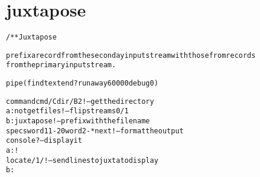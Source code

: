 \section{juxtapose}
\begin{shaded}
\begin{alltt}
/** Juxtapose

prefix a record from the seconday input stream with those from records
from the primary input stream.

pipe (findtext end ? runaway 60000 debug 0 )

   command cmd /C dir /B {2} !              -- get the directory
a: not getfiles !                           -- flip streams 0/1
b: juxtapose !                              -- prefix with the file name
   specs word1 1-20 word2-* next !          -- format the output
   console ?                                -- display it
a: !
   locate /{1}/ !                           -- send lines to juxta to display
b:

\end{alltt}
\end{shaded}
